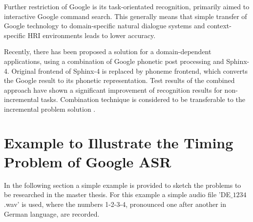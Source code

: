 Further restriction of Google is its task-orientated recognition, primarily 
aimed to interactive Google command search. This generally means that simple
transfer of Google technology to domain-specific natural dialogue systems and
context-specific HRI environments leads to lower accuracy. 

Recently, there has been proposed a solution for a domain-dependent
applications, using a combination of Google phonetic post processing and
Sphinx-4. Original frontend of Sphinx-4 is replaced by phoneme frontend, which
converts the Google result to its phonetic representation. Test
results of the combined approach have shown a significant improvement of
recognition results for non-incremental tasks.
Combination technique is considered to be transferable to the
incremental problem solution \parencite {twiefeletal2014}.

% 
% 


\section {Example to Illustrate the Timing Problem of Google ASR}
In the following section a simple example is provided to sketch the problems to
be researched in the master thesis. For this example  a simple audio file
'DE$\_$$1234$.wav' is used, where the numbers 1-2-3-4, pronounced one after
another in German language, are recorded. 

